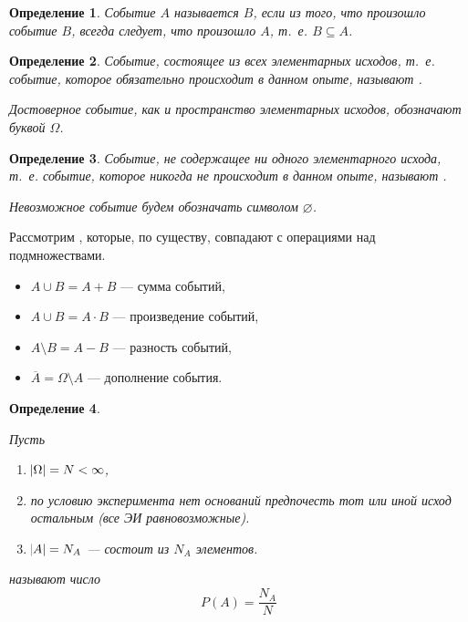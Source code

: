 \documentclass[a4paper]{report}
\theoremstyle{indented}
\newtheorem{definition}{Определение}[section]
\begin{document}
\begin{definition}
	\label{def:consequence-of-the-event}
	Событие $A$ называется  $B$, если из того, что произошло событие $B$, всегда следует, что произошло $A$, т.~е. $B\subseteq A$.
\end{definition}

\begin{definition}
	\label{def:certain-event}
	Событие, состоящее из всех элементарных исходов, т.~е. событие, которое обязательно происходит в данном опыте, называют .

	Достоверное событие, как и пространство элементарных исходов, обозначают буквой $\Omega$.
\end{definition}


\begin{definition}
	\label{def:impossible-event}
	Событие, не содержащее ни одного элементарного исхода, т.~е. событие, которое никогда не происходит в данном опыте, называют .

	Невозможное событие будем обозначать символом $\varnothing$.
\end{definition}


Рассмотрим , которые, по существу, совпадают с операциями над подмножествами.
\begin{itemize}
	\item $A \cup B = A + B$ — сумма событий,
	\item $A \cup B = A \cdot B$ — произведение событий,
	\item $A \setminus B = A - B $ — разность событий,
	\item $\overline A = \Omega \setminus A$ — дополнение события.
\end{itemize}

\begin{definition}
	\label{def:classical-probability}

	Пусть
	\begin{enumerate}
		\item $\abs \Omega = N < \infty$,
		\item по условию эксперимента нет оснований предпочесть тот или иной исход остальным (все ЭИ равновозможные).
		\item $\abs A = N_A$ — состоит из $N_A$ элементов.
	\end{enumerate}

	 называют число
	\begin{equation}
		\label{equ:classical-probability}
		P(A) = \frac{N_A}{N}
	\end{equation}
\end{definition}
\end{document}
